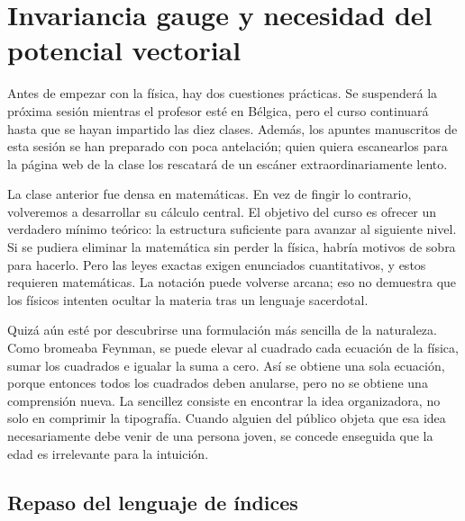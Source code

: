 \chapter{Invariancia gauge y necesidad del potencial vectorial}

Antes de empezar con la física, hay dos cuestiones prácticas. Se suspenderá la próxima sesión mientras el profesor esté en Bélgica, pero el curso continuará hasta que se hayan impartido las diez clases. Además, los apuntes manuscritos de esta sesión se han preparado con poca antelación; quien quiera escanearlos para la página web de la clase los rescatará de un escáner extraordinariamente lento.

La clase anterior fue densa en matemáticas. En vez de fingir lo contrario, volveremos a desarrollar su cálculo central. El objetivo del curso es ofrecer un verdadero mínimo teórico: la estructura suficiente para avanzar al siguiente nivel. Si se pudiera eliminar la matemática sin perder la física, habría motivos de sobra para hacerlo. Pero las leyes exactas exigen enunciados cuantitativos, y estos requieren matemáticas. La notación puede volverse arcana; eso no demuestra que los físicos intenten ocultar la materia tras un lenguaje sacerdotal.

Quizá aún esté por descubrirse una formulación más sencilla de la naturaleza. Como bromeaba Feynman, se puede elevar al cuadrado cada ecuación de la física, sumar los cuadrados e igualar la suma a cero. Así se obtiene una sola ecuación, porque entonces todos los cuadrados deben anularse, pero no se obtiene una comprensión nueva. La sencillez consiste en encontrar la idea organizadora, no solo en comprimir la tipografía. Cuando alguien del público objeta que esa idea necesariamente debe venir de una persona joven, se concede enseguida que la edad es irrelevante para la intuición.


\section{Repaso del lenguaje de índices}

